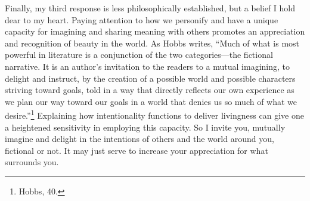 Finally, my third response is less philosophically established, but a
belief I hold dear to my heart. Paying attention to how we personify and
have a unique capacity for imagining and sharing meaning with others
promotes an appreciation and recognition of beauty in the world. As
Hobbs writes, ``Much of what is most powerful in literature is a
conjunction of the two categories---the fictional narrative. It is an
author's invitation to the readers to a mutual imagining, to delight and
instruct, by the creation of a possible world and possible characters
striving toward goals, told in a way that directly reflects our own
experience as we plan our way toward our goals in a world that denies us
so much of what we desire.''\footnote{Hobbs, 40.} Explaining how
intentionality functions to deliver livingness can give one a heightened
sensitivity in employing this capacity. So I invite you, mutually
imagine and delight in the intentions of others and the world around
you, fictional or not. It may just serve to increase your appreciation
for what surrounds you.


\clearpage
